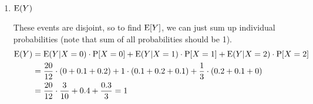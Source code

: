 \begin{enumerate}[label=(\alph*)]
\item $\text{E}(Y)$
\begin{solution}[3cm]
These events are disjoint, so to find  $\text{E}[Y]$, we can just sum up 
individual probabilities (note that sum of all probabilities should be 1). 
\begin{equation}
\begin{split}
\text{E}(Y) &= \text{E}(Y|X=0) \cdot \text{P}[X=0] + \text{E}(Y|X=1) \cdot \text{P}[X=1] + \text{E}(Y|X=2) 
\cdot \text{P}[X=2] \\ \nonumber
         &= \frac{20}{12} \cdot (0 + 0.1 + 0.2) + 1 \cdot (0.1 + 0.2 + 0.1) 
         + \frac{1}{3} \cdot (0.2 + 0.1 + 0) \\
         &= \frac{20}{12} \cdot \frac{3}{10} + 0.4 + \frac{0.3}{3} = 1
\end{split}
\end{equation}
\end{solution}
\end{enumerate}